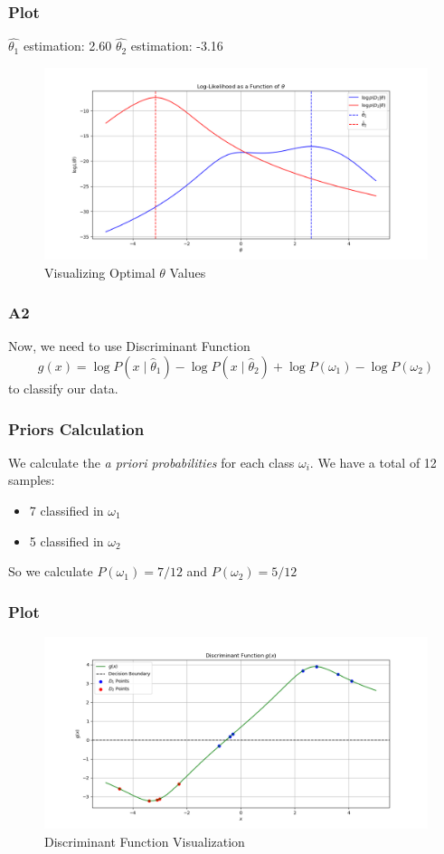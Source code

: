 \documentclass{beamer}
\begin{document}
\begin{frame}
\frametitle{Plot}
$\hat{\theta_1}$ estimation:  2.60
$\hat{\theta_2}$ estimation: -3.16
\begin{figure}
    \centering
    \includegraphics[width=1\linewidth]{assets/A1.png}
    \caption{Visualizing Optimal $\theta$ Values}
    \label{fig:enter-label}
\end{figure}
\end{frame}

\begin{frame}
\frametitle{A2}
Now, we need to use Discriminant Function $$ g(x) = \log P(x \mid \hat{\theta}_1) - \log P(x \mid \hat{\theta}_2) + \log P(\omega_1) - \log P(\omega_2) $$ to classify our data.
\end{frame}

\begin{frame}
\frametitle{Priors Calculation}
We calculate the \textit{a priori probabilities} for each class $\omega_i$. We have a total of 12 samples:
\begin{itemize}
    \item 7 classified in $\omega_1$
    \item 5 classified in $\omega_2$
\end{itemize}
\vspace{0.5cm}
So we calculate $P(\omega_1)=7/12$ and $P(\omega_2)=5/12$ 
\end{frame}


\begin{frame}
\frametitle{Plot}
\begin{figure}
    \centering
    \includegraphics[width=1\linewidth]{assets/A2.png}
    \caption{Discriminant Function Visualization}
    \label{fig:enter-label}
\end{figure}
\end{frame}
\end{document}
